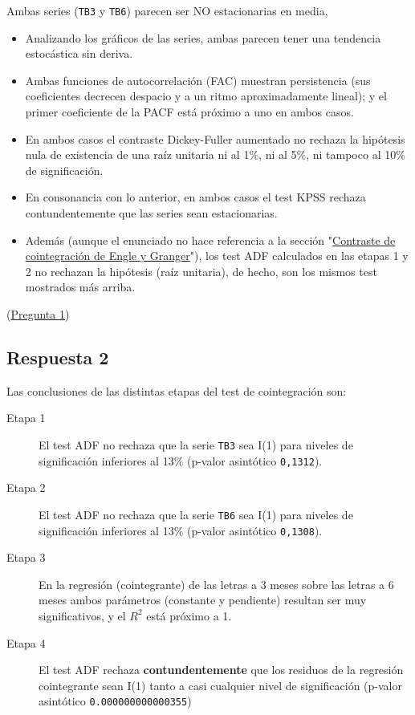 \documentclass[10pt]{article}
\begin{document}
Ambas series (\texttt{TB3} y \texttt{TB6}) parecen ser NO
estacionarias en media,
\begin{itemize}
\item Analizando los gráficos de las series, ambas parecen tener una
tendencia estocástica sin deriva.

\item Ambas funciones de autocorrelación (FAC) muestran persistencia (sus
coeficientes decrecen despacio y a un ritmo aproximadamente lineal);
y el primer coeficiente de la PACF está próximo a uno en ambos
casos.

\item En ambos casos el contraste Dickey-Fuller aumentado no rechaza la
hipótesis nula de existencia de una raíz unitaria ni al 1\%, ni al
5\%, ni tampoco al 10\% de significación.

\item En consonancia con lo anterior, en ambos casos el test KPSS rechaza
contundentemente que las series sean estacionarias.

\item Además (aunque el enunciado no hace referencia a la sección
"\hyperref[sec:orga1b8793]{Contraste de cointegración de Engle y Granger}"), los test ADF
calculados en las etapas 1 y 2 no rechazan la hipótesis (raíz
unitaria), de hecho, son los mismos test mostrados más arriba.
\end{itemize}

(\hyperref[sec:org3821181]{Pregunta 1})
\subsection*{Respuesta 2}
\label{sec:orgab5d8fe}

Las conclusiones de las distintas etapas del test de cointegración son:
\begin{description}
\item[{Etapa 1}] El test ADF no rechaza que la serie \texttt{TB3} sea
I(1) para niveles de significación inferiores al 13\% (p-valor
asintótico \texttt{0,1312}).
\item[{Etapa 2}] El test ADF no rechaza que la serie \texttt{TB6} sea
I(1) para niveles de significación inferiores al 13\% (p-valor
asintótico \texttt{0,1308}).
\item[{Etapa 3}] En la regresión (cointegrante) de las letras a 3 meses
sobre las letras a 6 meses ambos parámetros (constante y pendiente)
resultan ser muy significativos, y el \(R^2\) está próximo a 1.
\item[{Etapa 4}] El test ADF rechaza \textbf{contundentemente} que los residuos
de la regresión cointegrante sean I(1) tanto a casi cualquier nivel
de significación (p-valor asintótico \texttt{0.000000000000355})
\end{description}
\end{document}
